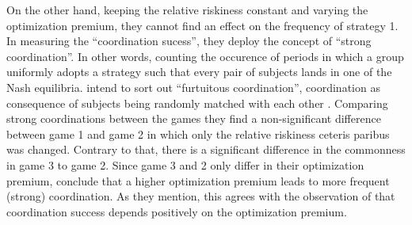 On the other hand, keeping the relative riskiness constant and varying the
optimization premium, they cannot find an effect on the frequency of 
strategy 1. 
In measuring the ``coordination sucess'', they deploy the concept of ``strong
coordination''. 
In other words, counting the occurence of periods in which a group
uniformly adopts a strategy such that every pair of subjects lands in one
of the Nash equilibria. \textcite{dubois_optimization_2012} intend to sort 
out ``furtuitous coordination'', coordination as consequence of subjects being
randomly matched with each other \parencite[373]{dubois_optimization_2012}.
Comparing strong coordinations between the games they find a non-significant 
difference between game 1 and game 2 in which only the relative riskiness 
ceteris paribus was changed. Contrary to that, there is a significant 
difference in the commonness in game 3 to game 2.
Since game 3 and 2 only differ in their optimization premium, 
\textcite{dubois_optimization_2012} conclude that a higher optimization
premium leads to more frequent (strong) coordination. 
As they mention, this agrees with the observation of 
\textcite{battalio_optimization_2001} that coordination success depends 
positively on the optimization premium. 


